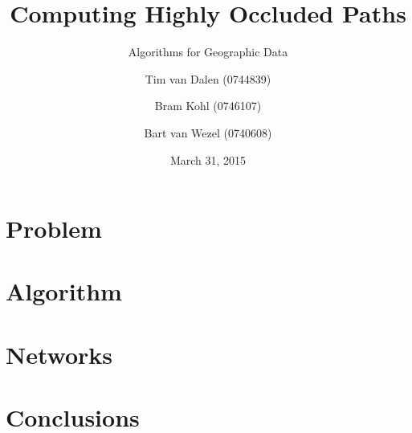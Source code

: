\documentclass[english,aspectratio=43]{beamer}
\title{Computing Highly Occluded Paths}
\subtitle{Algorithms for Geographic Data}
\author[Group 10]{
	Tim van Dalen (0744839)
	\and
	Bram Kohl (0746107)\\
	\and
	Bart van Wezel (0740608)
}
\institute[TU/e]
{
    WIS\\
	Eindhoven University of Technology
}
\date{March 31, 2015}
\begin{document}
	\begin{frame}
		\titlepage
	\end{frame}

	\section{Problem}
	

	\section{Algorithm}
	

	\section{Networks}
	

	\section{Conclusions}
	

	\begin{frame}{}
	\end{frame}
\end{document}
